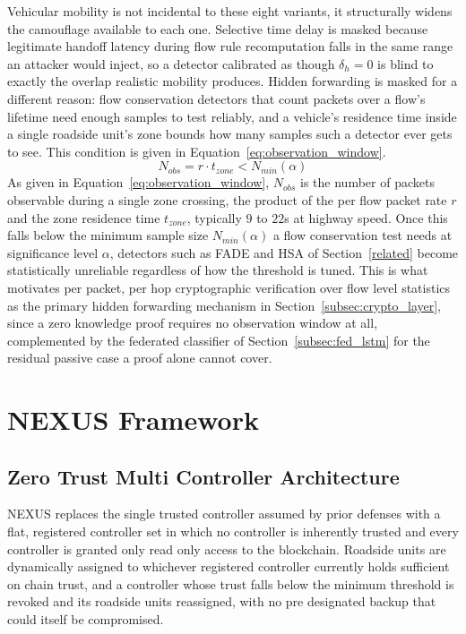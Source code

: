 \documentclass[lettersize,journal]{IEEEtran}
\theoremstyle{plain}
\theoremstyle{remark}
\begin{document}
	Vehicular mobility is not incidental to these eight variants, it
	structurally widens the camouflage available to each one. Selective
	time delay is masked because legitimate handoff latency during flow
	rule recomputation falls in the same range an attacker would inject,
	so a detector calibrated as though $\delta_h{=}0$ is blind to exactly
	the overlap realistic mobility produces. Hidden forwarding is masked
	for a different reason: flow conservation detectors that count packets
	over a flow's lifetime need enough samples to test reliably, and a
	vehicle's residence time inside a single roadside unit's zone bounds
	how many samples such a detector ever gets to see. This condition is
	given in Equation~\eqref{eq:observation_window}.
	\begin{equation}
		N_{obs} = r \cdot t_{zone} < N_{min}(\alpha)
		\label{eq:observation_window}
	\end{equation}
	As given in Equation~\eqref{eq:observation_window}, $N_{obs}$ is the
	number of packets observable during a single zone crossing, the
	product of the per flow packet rate $r$ and the zone residence time
	$t_{zone}$, typically $9$ to $22$s at highway speed. Once this falls
	below the minimum sample size $N_{min}(\alpha)$ a flow conservation
	test needs at significance level $\alpha$, detectors such as FADE and
	HSA of Section~\ref{related} become statistically unreliable
	regardless of how the threshold is tuned. This is what motivates
	per packet, per hop cryptographic verification over flow level
	statistics as the primary hidden forwarding mechanism in
	Section~\ref{subsec:crypto_layer}, since a zero knowledge proof
	requires no observation window at all, complemented by the federated
	classifier of Section~\ref{subsec:fed_lstm} for the residual passive
	case a proof alone cannot cover.
	
	
	\section{NEXUS Framework}\label{framework}
	
	\subsection{Zero Trust Multi Controller Architecture}\label{subsec:ctrl_trust}
	
	NEXUS replaces the single trusted controller assumed by prior defenses
	with a flat, registered controller set in which no controller is
	inherently trusted and every controller is granted only read only access
	to the blockchain. Roadside units are dynamically assigned to whichever
	registered controller currently holds sufficient on chain trust, and a
	controller whose trust falls below the minimum threshold is revoked and
	its roadside units reassigned, with no pre designated backup that could
	itself be compromised.
	
\end{document}
